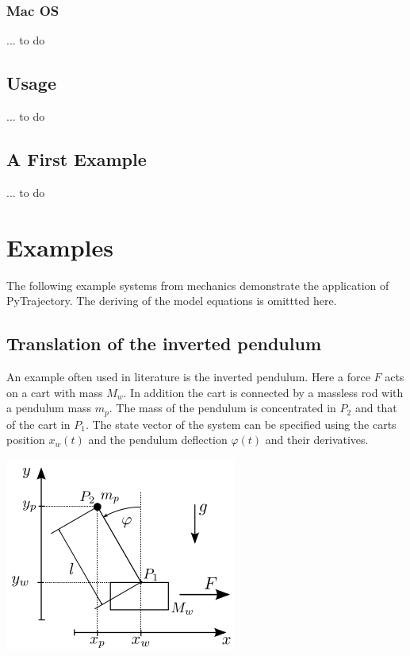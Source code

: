 \documentclass[letterpaper,10pt,english]{sphinxmanual}
\begin{document}
\subsubsection{Mac OS}
\label{guide/start:mac-os}
... to do


\subsection{Usage}
\label{guide/start:usage}
... to do


\subsection{A First Example}
\label{guide/start:a-first-example}
... to do


\section{Examples}
\label{guide/examples/index::doc}\label{guide/examples/index:examples}\label{guide/examples/index:id1}
The following example systems from mechanics demonstrate the application
of PyTrajectory. The deriving of the model equations is omittted here.


\subsection{Translation of the inverted pendulum}
\label{guide/examples/inv_pendulum_trans:ex-inv-pend}\label{guide/examples/inv_pendulum_trans::doc}\label{guide/examples/inv_pendulum_trans:translation-of-the-inverted-pendulum}
An example often used in literature is the inverted pendulum. Here a
force \(F\) acts on a cart with mass \(M_w\). In addition the
cart is connected by a massless rod with a pendulum mass \(m_p\).
The mass of the pendulum is concentrated in \(P_2\) and that of the
cart in \(P_1\). The state vector of the system can be specified
using the carts position \(x_w(t)\) and the pendulum deflection
\(\varphi(t)\) and their derivatives.

\includegraphics{inv_pendulum.png}
\end{document}
